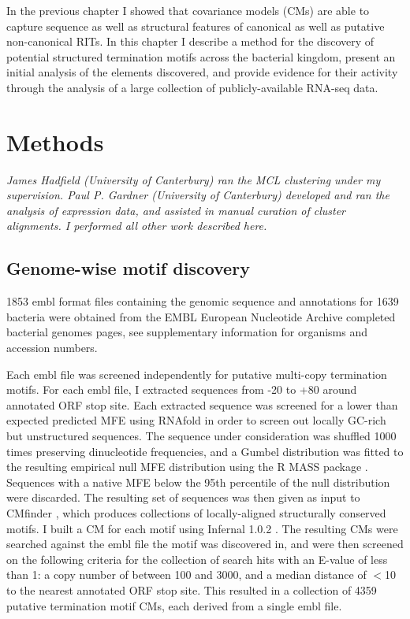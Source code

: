 
In the previous chapter I showed that covariance models (CMs) are able to capture sequence as well as structural features of canonical as well as putative non-canonical RITs. In this chapter I describe a method for the discovery of potential structured termination motifs across the bacterial kingdom, present an initial analysis of the elements discovered, and provide evidence for their activity through the analysis of a large collection of publicly-available RNA-seq data.

\section{Methods}

\textit{James Hadfield (University of Canterbury) ran the MCL clustering under my supervision. Paul P. Gardner (University of Canterbury) developed and ran the analysis of expression data, and assisted in manual curation of cluster alignments. I performed all other work described here. }

\subsection{Genome-wise motif discovery}
1853 embl format files containing the genomic sequence and annotations for 1639 bacteria were obtained from the EMBL European Nucleotide Archive completed bacterial genomes pages, see supplementary information for organisms and accession numbers.

Each embl file was screened independently for putative multi-copy termination motifs. For each embl file, I extracted sequences from -20 to +80 around annotated ORF stop site. Each extracted sequence was screened for a lower than expected predicted MFE using RNAfold in order to screen out locally GC-rich but unstructured sequences. The sequence under consideration was shuffled 1000 times preserving dinucleotide frequencies, and a Gumbel distribution was fitted to the resulting empirical null MFE distribution using the R MASS package \parencite{Venables1994}. Sequences with a native MFE below the 95th percentile of the null distribution were discarded. The resulting set of sequences was then given as input to CMfinder \parencite{Yao2006}, which produces collections of locally-aligned structurally conserved motifs. I built a CM for each motif using Infernal 1.0.2 \parencite{Nawrocki2009}.  The resulting CMs were searched against the embl file the motif was discovered in, and were then screened on the following criteria for the collection of search hits with an E-value of less than 1: a copy number of between 100 and 3000, and a median distance of $<$10 to the nearest annotated ORF stop site. This resulted in a collection of 4359 putative termination motif CMs, each derived from a single embl file. 

